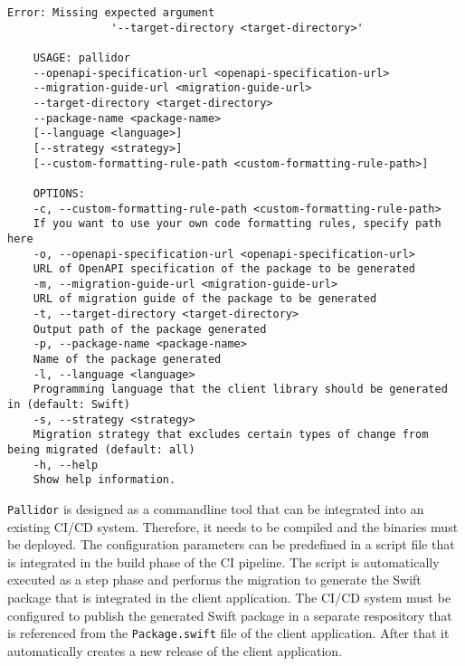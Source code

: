 \begin{lstlisting}[language=Tex, caption={Commandline arguments of Pallidor to support user}, captionpos=b, label={lst:arguments}]
	Error: Missing expected argument 
				'--target-directory <target-directory>'
	
	USAGE: pallidor 
	--openapi-specification-url <openapi-specification-url> 
	--migration-guide-url <migration-guide-url>
	--target-directory <target-directory> 
	--package-name <package-name> 
	[--language <language>] 
	[--strategy <strategy>]
	[--custom-formatting-rule-path <custom-formatting-rule-path>]
	
	OPTIONS:
	-c, --custom-formatting-rule-path <custom-formatting-rule-path>
	If you want to use your own code formatting rules, specify path here 
	-o, --openapi-specification-url <openapi-specification-url>
	URL of OpenAPI specification of the package to be generated 
	-m, --migration-guide-url <migration-guide-url>
	URL of migration guide of the package to be generated 
	-t, --target-directory <target-directory>
	Output path of the package generated 
	-p, --package-name <package-name>
	Name of the package generated 
	-l, --language <language>
	Programming language that the client library should be generated in (default: Swift)
	-s, --strategy <strategy>
	Migration strategy that excludes certain types of change from being migrated (default: all)
	-h, --help
	Show help information.

\end{lstlisting}

\texttt{Pallidor} is designed as a commandline tool that can be integrated into an existing CI/CD system. Therefore, it needs to be compiled and the binaries must be deployed. The configuration parameters can be predefined in a script file that is integrated in the build phase of the CI pipeline. The script is automatically executed as a step phase and performs the migration to generate the Swift package that is integrated in the client application. The CI/CD system must be configured to publish the generated Swift package in a separate respository that is referenced from the \texttt{Package.swift} file of the client application. After that it automatically creates a new release of the client application.